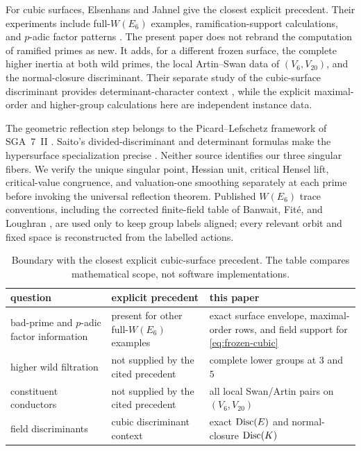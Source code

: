 For cubic surfaces, Elsenhans and Jahnel give the closest explicit precedent.
Their experiments include full-$W(E_6)$ examples, ramification-support
calculations, and $p$-adic factor patterns
\citep[Propositions 21--22, pp.~651--652]
{elsenhansjahnel2009experiments}.  The present paper does not rebrand the
computation of ramified primes as new.  It adds, for a different frozen
surface, the complete higher inertia at both wild primes, the local
Artin--Swan data of $(V_6,V_{20})$, and the normal-closure discriminant.
Their separate study of the cubic-surface discriminant provides
determinant-character context
\citep[Theorem 2.12]{elsenhansjahnel2012discriminant}, while the explicit
maximal-order and higher-group calculations here are independent instance
data.

The geometric reflection step belongs to the Picard--Lefschetz framework of
SGA~7~II \citep{sga7ii1973}.  Saito's divided-discriminant and determinant
formulas make the hypersurface specialization precise
\citep{saito2012discriminant}.  Neither source identifies our three singular
fibers.  We verify the unique singular point, Hessian unit, critical Hensel
lift, critical-value congruence, and valuation-one smoothing separately at
each prime before invoking the universal reflection theorem.  Published
$W(E_6)$ trace conventions, including the corrected finite-field table of
Banwait, Fit\'e, and Loughran \citep{banwaitfite2019delpezzo}, are used only
to keep group labels aligned; every relevant orbit and fixed space is
reconstructed from the labelled actions.

\begin{table}[ht]
\centering
\caption{Boundary with the closest explicit cubic-surface precedent.  The
table compares mathematical scope, not software implementations.}
\label{tab:precedent-boundary}
\begin{tabularx}{\textwidth}{@{}l >{\raggedright\arraybackslash}X >{\raggedright\arraybackslash}X@{}}
\toprule
question&explicit precedent&this paper\\
\midrule
bad-prime and $p$-adic factor information&
present for other full-$W(E_6)$ examples&
exact surface envelope, maximal-order rows, and field support for
\cref{eq:frozen-cubic}\\
higher wild filtration&
not supplied by the cited precedent&
complete lower groups at $3$ and $5$\\
constituent conductors&
not supplied by the cited precedent&
all local Swan/Artin pairs on $(V_6,V_{20})$\\
field discriminants&
cubic discriminant context&
exact $\operatorname{Disc}(E)$ and normal-closure $\operatorname{Disc}(K)$\\
\bottomrule
\end{tabularx}
\end{table}

